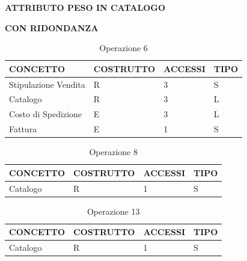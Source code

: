 \centerline{\textbf{ATTRIBUTO PESO IN CATALOGO}}
\vspace{1cm}
\centerline{\textbf{CON RIDONDANZA}}



\begin{table}[H]
\centering
\caption{Operazione 6}
\begin{tabular}{llll}
\\ \hline
\multicolumn{1}{|l|}{\textbf{CONCETTO}} & \multicolumn{1}{l|}{\textbf{COSTRUTTO}} & \multicolumn{1}{l|}{\textbf{ACCESSI}} & \multicolumn{1}{l|}{\textbf{TIPO}} \\ \hline
\multicolumn{1}{|l|}{Stipulazione Vendita}
& \multicolumn{1}{l|}{R}                  & \multicolumn{1}{l|}{3}                & \multicolumn{1}{l|}{S}             \\ \hline
\multicolumn{1}{|l|}{Catalogo}             & \multicolumn{1}{l|}{R}                  & \multicolumn{1}{l|}{3}
& \multicolumn{1}{l|}{L}
			 \\ \hline
\multicolumn{1}{|l|}{Costo di Spedizione}     & \multicolumn{1}{l|}{E}                  & \multicolumn{1}{l|}{3}      & \multicolumn{1}{l|}{L}
			 \\ \hline
\multicolumn{1}{|l|}{Fattura}
& \multicolumn{1}{l|}{E}                  & \multicolumn{1}{l|}{1}                & \multicolumn{1}{l|}{S}             \\ \hline
\end{tabular}
\end{table}

\begin{table}[H]
\centering
\caption{Operazione 8}
\begin{tabular}{llll}
\\ \hline
\multicolumn{1}{|l|}{\textbf{CONCETTO}} & \multicolumn{1}{l|}{\textbf{COSTRUTTO}} & \multicolumn{1}{l|}{\textbf{ACCESSI}} & \multicolumn{1}{l|}{\textbf{TIPO}} \\ \hline
\multicolumn{1}{|l|}{Catalogo}
& \multicolumn{1}{l|}{R}                  & \multicolumn{1}{l|}{1}                & \multicolumn{1}{l|}{S}             \\ \hline
\end{tabular}
\end{table}

\begin{table}[H]
\centering
\caption{Operazione 13}
\begin{tabular}{llll}
\\ \hline
\multicolumn{1}{|l|}{\textbf{CONCETTO}} & \multicolumn{1}{l|}{\textbf{COSTRUTTO}} & \multicolumn{1}{l|}{\textbf{ACCESSI}} & \multicolumn{1}{l|}{\textbf{TIPO}} \\ \hline
\multicolumn{1}{|l|}{Catalogo}
& \multicolumn{1}{l|}{R}                  & \multicolumn{1}{l|}{1}                & \multicolumn{1}{l|}{S}             \\ \hline
\end{tabular}
\end{table}


